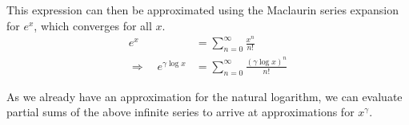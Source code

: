 This expression can then be approximated using the Maclaurin series expansion for $e^x$, which converges for all $x$.
\begin{align*}
  e^x &= \sum_{n=0}^{\infty}{\frac{x^n}{n!}}\\
  \Rightarrow \quad e^{\gamma\log{x}} &= \sum_{n=0}^{\infty}{\frac{(\gamma\log{x})^n}{n!}}
\end{align*}

As we already have an approximation for the natural logarithm, we can evaluate partial sums of the above infinite series to arrive at approximations for $x^\gamma$.